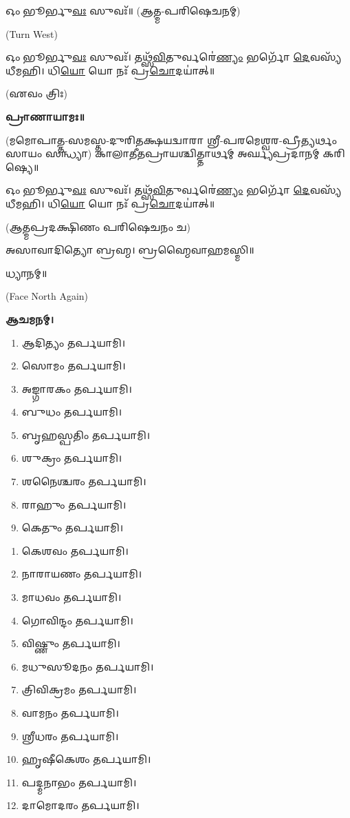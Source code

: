 𑌓𑌂 𑌭𑍂𑌰𑍍𑌭𑍁\-\ul{𑌵𑌃} 𑌸𑍁𑌵𑌃᳴॥ (𑌆𑌤𑍍𑌮-𑌪𑌰𑌿𑌷𑍇𑌚𑌨𑌮𑍍)


{\scriptsize (Turn West)}

𑌓𑌂 𑌭𑍂𑌰𑍍𑌭𑍁\-\ul{𑌵𑌃} 𑌸𑍁𑌵𑌃᳴। 𑌤𑌥𑍍𑌸᳴\-\ul{𑌵𑌿}\-𑌤𑍁𑌰𑍍𑌵𑌰𑍇॑\-\ul{𑌣𑍍𑌯𑌂} 𑌭𑌰𑍍𑌗𑍋᳴ \ul{𑌦𑍇}\-𑌵𑌸𑍍𑌯᳴ 𑌧𑍀𑌮𑌹𑌿। 𑌧𑌿\-\ul{𑌯𑍋} 𑌯𑍋 𑌨𑌃᳴ 𑌪𑍍𑌰\-\ul{𑌚𑍋}\-𑌦𑌯𑌾॑𑌤𑍍॥

\hfill{(𑌏𑌵𑌂 𑌤𑍍𑌰𑌿𑌃)}


\textbf{𑌪𑍍𑌰𑌾𑌣𑌾𑌯𑌾𑌮𑌃॥}

(𑌮𑌮𑍋𑌪𑌾𑌤𑍍𑌤-𑌸𑌮𑌸𑍍𑌤-𑌦𑍁𑌰𑌿𑌤𑌕𑍍𑌷𑌯𑌦𑍍𑌵𑌾𑌰𑌾 𑌶𑍍𑌰𑍀-𑌪𑌰𑌮𑍇𑌶𑍍𑌵𑌰-𑌪𑍍𑌰𑍀𑌤𑍍𑌯𑌰𑍍𑌥𑌂 𑌸𑌾𑌯𑌂 𑌸𑌨𑍍𑌧𑍍𑌯𑌾)
𑌕𑌾𑌲𑌾𑌤𑍀𑌤𑌪𑍍𑌰𑌾𑌯𑌶𑍍𑌚𑌿𑌤𑍍𑌤𑌾𑌰𑍍𑌥𑌮𑍍 𑌅𑌰𑍍𑌘𑍍𑌯𑌪𑍍𑌰𑌦𑌾𑌨𑌮𑍍 𑌕𑌰𑌿𑌷𑍍𑌯𑍇॥

𑌓𑌂 𑌭𑍂𑌰𑍍𑌭𑍁\-\ul{𑌵𑌃} 𑌸𑍁𑌵𑌃᳴। 𑌤𑌥𑍍𑌸᳴\-\ul{𑌵𑌿}\-𑌤𑍁𑌰𑍍𑌵𑌰𑍇॑\-\ul{𑌣𑍍𑌯𑌂} 𑌭𑌰𑍍𑌗𑍋᳴ \ul{𑌦𑍇}\-𑌵𑌸𑍍𑌯᳴ 𑌧𑍀𑌮𑌹𑌿। 𑌧𑌿\-\ul{𑌯𑍋} 𑌯𑍋 𑌨𑌃᳴ 𑌪𑍍𑌰\-\ul{𑌚𑍋}\-𑌦𑌯𑌾॑𑌤𑍍॥

(𑌆𑌤𑍍𑌮𑌪𑍍𑌰𑌦𑌕𑍍𑌷𑌿𑌣𑌂 𑌪𑌰𑌿𑌷𑍇𑌚𑌨𑌂 𑌚)


𑌅𑌸𑌾𑌵𑌾𑌦𑌿𑌤𑍍𑌯𑍋 𑌬𑍍𑌰𑌹𑍍𑌮। 𑌬𑍍𑌰𑌹𑍍𑌮𑍈𑌵𑌾𑌹𑌮𑌸𑍍𑌮𑌿॥

𑌧𑍍𑌯𑌾𑌨𑌮𑍍॥

{\scriptsize (Face North Again)}

\textbf{𑌆𑌚𑌮𑌨𑌮𑍍।}



\begin{enumerate}
 \item 𑌆𑌦𑌿𑌤𑍍𑌯𑌂 𑌤𑌰𑍍𑌪𑌯𑌾𑌮𑌿।
 \item 𑌸𑍋𑌮𑌂 𑌤𑌰𑍍𑌪𑌯𑌾𑌮𑌿।
 \item 𑌅𑌙𑍍𑌗𑌾𑌰𑌕𑌂 𑌤𑌰𑍍𑌪𑌯𑌾𑌮𑌿।
 \item 𑌬𑍁𑌧𑌂 𑌤𑌰𑍍𑌪𑌯𑌾𑌮𑌿।
 \item 𑌬𑍃𑌹𑌸𑍍𑌪𑌤𑌿𑌂 𑌤𑌰𑍍𑌪𑌯𑌾𑌮𑌿।
 \item 𑌶𑍁𑌕𑍍𑌰𑌂 𑌤𑌰𑍍𑌪𑌯𑌾𑌮𑌿।
 \item 𑌶𑌨𑍈𑌶𑍍𑌚𑌰𑌂 𑌤𑌰𑍍𑌪𑌯𑌾𑌮𑌿।
 \item 𑌰𑌾𑌹𑍁𑌂 𑌤𑌰𑍍𑌪𑌯𑌾𑌮𑌿।
 \item 𑌕𑍇𑌤𑍁𑌂 𑌤𑌰𑍍𑌪𑌯𑌾𑌮𑌿।
\end{enumerate}


\begin{enumerate}
\item 𑌕𑍇𑌶𑌵𑌂 𑌤𑌰𑍍𑌪𑌯𑌾𑌮𑌿।
\item 𑌨𑌾𑌰𑌾𑌯𑌣𑌂 𑌤𑌰𑍍𑌪𑌯𑌾𑌮𑌿।
\item 𑌮𑌾𑌧𑌵𑌂 𑌤𑌰𑍍𑌪𑌯𑌾𑌮𑌿।
\item 𑌗𑍋𑌵𑌿𑌨𑍍𑌦𑌂 𑌤𑌰𑍍𑌪𑌯𑌾𑌮𑌿।
\item 𑌵𑌿𑌷𑍍𑌣𑍁𑌂 𑌤𑌰𑍍𑌪𑌯𑌾𑌮𑌿।
\item 𑌮𑌧𑍁𑌸𑍂𑌦𑌨𑌂 𑌤𑌰𑍍𑌪𑌯𑌾𑌮𑌿।
\item 𑌤𑍍𑌰𑌿𑌵𑌿𑌕𑍍𑌰𑌮𑌂 𑌤𑌰𑍍𑌪𑌯𑌾𑌮𑌿।
\item 𑌵𑌾𑌮𑌨𑌂 𑌤𑌰𑍍𑌪𑌯𑌾𑌮𑌿।
\item 𑌶𑍍𑌰𑍀𑌧𑌰𑌂 𑌤𑌰𑍍𑌪𑌯𑌾𑌮𑌿।
\item 𑌹𑍃𑌷𑍀𑌕𑍇𑌶𑌂 𑌤𑌰𑍍𑌪𑌯𑌾𑌮𑌿।
\item 𑌪𑌦𑍍𑌮𑌨𑌾𑌭𑌂 𑌤𑌰𑍍𑌪𑌯𑌾𑌮𑌿।
\item 𑌦𑌾𑌮𑍋𑌦𑌰𑌂 𑌤𑌰𑍍𑌪𑌯𑌾𑌮𑌿।
\end{enumerate}

